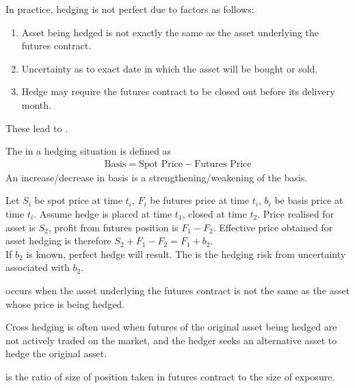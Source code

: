 In practice, hedging is not perfect due to factors as follows:
\begin{enumerate}[label=\arabic*.]
\setlength{\itemsep}{0pt}
\item Asset being hedged is not exactly the same as the asset underlying the futures contract.
\item Uncertainty as to exact date in which the asset will be bought or sold.
\item Hedge may require the futures contract to be closed out before its delivery month.
\end{enumerate}
These lead to .

\begin{definition}
The  in a hedging situation is defined as
\begin{align}
\text{Basis} = \text{Spot Price} - \text{Futures Price} \nonumber
\end{align}
An increase/decrease in basis is a strengthening/weakening of the basis.
\end{definition}

\begin{definition}
Let $S_i$ be spot price at time $t_i$, $F_i$ be futures price at time $t_i$, $b_i$ be basis price at time $t_i$.	 Assume hedge is placed at time $t_1$, closed at time $t_2$. Price realised for asset is $S_2$, profit from futures position is $F_1 - F_2$.  Effective price obtained for asset hedging is therefore $S_2 + F_1 - F_2 = F_1 + b_2$.\\
If $b_2$ is known, perfect hedge will result. The  is the hedging risk from uncertainty associated with $b_2$.
\end{definition}

\begin{definition}
 occurs when the asset underlying the futures contract is not the same as the asset whose price is being hedged.
\end{definition}

Cross hedging is often used when futures of the original asset being hedged are not actively traded on the market, and the hedger seeks an alternative asset to hedge the original asset.

\begin{definition}
 is the ratio of size of position taken in futures contract to the size of exposure.
\end{definition}

